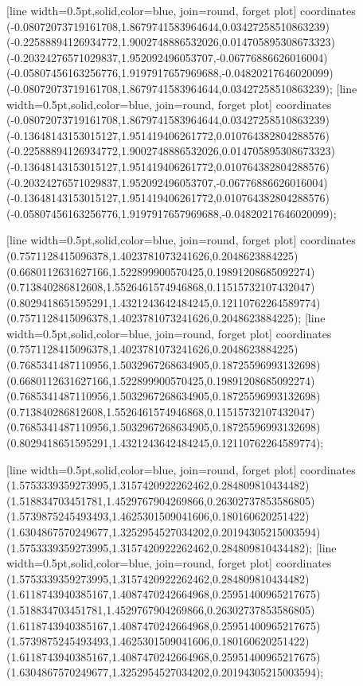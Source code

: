 [line width=0.5pt,solid,color=blue, join=round, forget plot] coordinates {(-0.08072073719161708,1.8679741583964644,0.03427258510863239) (-0.22588894126934772,1.9002748886532026,0.014705895308673323) (-0.20324276571029837,1.952092496053707,-0.06776886626016004) (-0.05807456163256776,1.9197917657969688,-0.04820217646020099) (-0.08072073719161708,1.8679741583964644,0.03427258510863239)};
[line width=0.5pt,solid,color=blue, join=round, forget plot] coordinates {(-0.08072073719161708,1.8679741583964644,0.03427258510863239) (-0.13648143153015127,1.951419406261772,0.010764382804288576) (-0.22588894126934772,1.9002748886532026,0.014705895308673323) (-0.13648143153015127,1.951419406261772,0.010764382804288576) (-0.20324276571029837,1.952092496053707,-0.06776886626016004) (-0.13648143153015127,1.951419406261772,0.010764382804288576) (-0.05807456163256776,1.9197917657969688,-0.04820217646020099)};

[line width=0.5pt,solid,color=blue, join=round, forget plot] coordinates {(0.7571128415096378,1.4023781073241626,0.2048623884225) (0.6680112631627166,1.522899900570425,0.19891208685092274) (0.713840286812608,1.5526461574946868,0.11515732107432047) (0.8029418651595291,1.4321243642484245,0.12110762264589774) (0.7571128415096378,1.4023781073241626,0.2048623884225)};
[line width=0.5pt,solid,color=blue, join=round, forget plot] coordinates {(0.7571128415096378,1.4023781073241626,0.2048623884225) (0.7685341487110956,1.5032967268634905,0.18725596993132698) (0.6680112631627166,1.522899900570425,0.19891208685092274) (0.7685341487110956,1.5032967268634905,0.18725596993132698) (0.713840286812608,1.5526461574946868,0.11515732107432047) (0.7685341487110956,1.5032967268634905,0.18725596993132698) (0.8029418651595291,1.4321243642484245,0.12110762264589774)};

[line width=0.5pt,solid,color=blue, join=round, forget plot] coordinates {(1.5753339359273995,1.3157420922262462,0.284809810434482) (1.518834703451781,1.4529767904269866,0.26302737853586805) (1.5739875245493493,1.4625301509041606,0.180160620251422) (1.6304867570249677,1.3252954527034202,0.20194305215003594) (1.5753339359273995,1.3157420922262462,0.284809810434482)};
[line width=0.5pt,solid,color=blue, join=round, forget plot] coordinates {(1.5753339359273995,1.3157420922262462,0.284809810434482) (1.6118743940385167,1.4087470242664968,0.25951400965217675) (1.518834703451781,1.4529767904269866,0.26302737853586805) (1.6118743940385167,1.4087470242664968,0.25951400965217675) (1.5739875245493493,1.4625301509041606,0.180160620251422) (1.6118743940385167,1.4087470242664968,0.25951400965217675) (1.6304867570249677,1.3252954527034202,0.20194305215003594)};

